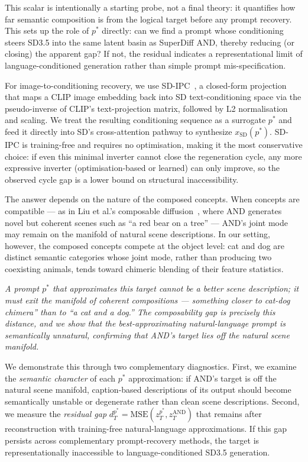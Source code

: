 This scalar is intentionally a starting probe, not a final theory: it quantifies how far semantic composition is from the logical target before any prompt recovery. This sets up the role of $p^*$ directly: can we find a prompt whose conditioning steers SD3.5 into the same latent basin as SuperDiff AND, thereby reducing (or closing) the apparent gap? If not, the residual indicates a representational limit of language-conditioned generation rather than simple prompt mis-specification.

For image-to-conditioning recovery, we use SD-IPC~\cite{ding2023sdipc}, a closed-form projection that maps a CLIP image embedding back into SD text-conditioning space via the pseudo-inverse of CLIP's text-projection matrix, followed by L2 normalisation and scaling. We treat the resulting conditioning sequence as a surrogate \(p^*\) and feed it directly into SD's cross-attention pathway to synthesize \(x_{\mathrm{SD}}(p^*)\). SD-IPC is training-free and requires no optimisation, making it the most conservative choice: if even this minimal inverter cannot close the regeneration cycle, any more expressive inverter (optimisation-based or learned) can only improve, so the observed cycle gap is a lower bound on structural inaccessibility.

The answer depends on the nature of the composed concepts. When concepts are compatible — as in Liu et al.'s composable diffusion~\cite{liu2022compositional}, where AND generates novel but coherent scenes such as ``a red bear on a tree'' — AND's joint mode may remain on the manifold of natural scene descriptions. In our setting, however, the composed concepts compete at the object level: cat and dog are distinct semantic categories whose joint mode, rather than producing two coexisting animals, tends toward chimeric blending of their feature statistics. 

\textit{A prompt $p^*$ that approximates this target cannot be a better scene description; it must exit the manifold of coherent compositions — something closer to cat-dog chimera'' than to ``a cat and a dog.'' The composability gap is precisely this distance, and we show that the best-approximating natural-language prompt is semantically unnatural, confirming that AND's target lies off the natural scene manifold.}

We demonstrate this through two complementary diagnostics. First, we examine the \emph{semantic character} of each $p^*$ approximation: if AND's target is off the natural scene manifold, caption-based descriptions of its output should become semantically unstable or degenerate rather than clean scene descriptions. Second, we measure the \emph{residual gap} $d_T^{p^*} = \mathrm{MSE}(z_T^{p^*}, z_T^{\mathrm{AND}})$ that remains after reconstruction with training-free natural-language approximations. If this gap persists across complementary prompt-recovery methods, the target is representationally inaccessible to language-conditioned SD3.5 generation.
